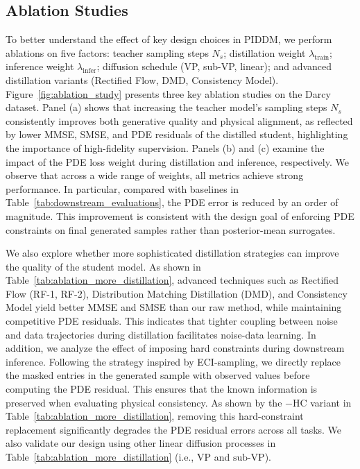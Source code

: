 \documentclass{article}
\theoremstyle{plain}
\theoremstyle{definition}
\theoremstyle{remark}
\begin{document}
\subsection{Ablation Studies}\label{sec:ablation}


To better understand the effect of key design choices in PIDDM, we perform ablations on five factors: teacher sampling steps \(N_s\); distillation weight \(\lambda_{\text{train}}\); inference weight \(\lambda_{\text{infer}}\); diffusion schedule (VP, sub-VP, linear); and advanced distillation variants (Rectified Flow, DMD, Consistency Model). Figure~\ref{fig:ablation_study} presents three key ablation studies on the Darcy dataset. Panel (a) shows that increasing the teacher model's sampling steps $N_s$ consistently improves both generative quality and physical alignment, as reflected by lower MMSE, SMSE, and PDE residuals of the distilled student, highlighting the importance of high-fidelity supervision. Panels (b) and (c) examine the impact of the PDE loss weight during distillation and inference, respectively. We observe that across a wide range of weights, all metrics achieve strong performance. In particular, compared with baselines in Table~\ref{tab:downstream_evaluations}, the PDE error is reduced by an order of magnitude. This improvement is consistent with the design goal of enforcing PDE constraints on final generated samples rather than posterior-mean surrogates.

We also explore whether more sophisticated distillation strategies can improve the quality of the student model. As shown in Table~\ref{tab:ablation_more_distillation}, advanced techniques such as Rectified Flow (RF-1, RF-2), Distribution Matching Distillation (DMD), and Consistency Model yield better MMSE and SMSE than our raw method, while maintaining competitive PDE residuals. This indicates that tighter coupling between noise and data trajectories during distillation facilitates noise-data learning. In addition, we analyze the effect of imposing hard constraints during downstream inference. Following the strategy inspired by ECI-sampling, we directly replace the masked entries in the generated sample with observed values before computing the PDE residual. This ensures that the known information is preserved when evaluating physical consistency. As shown by the $-\text{HC}$ variant in Table~\ref{tab:ablation_more_distillation}, removing this hard-constraint replacement significantly degrades the PDE residual errors across all tasks. We also validate our design using other linear diffusion processes in Table~\ref{tab:ablation_more_distillation} (i.e., $\text{VP}$ and $\text{sub-VP}$).
\end{document}
